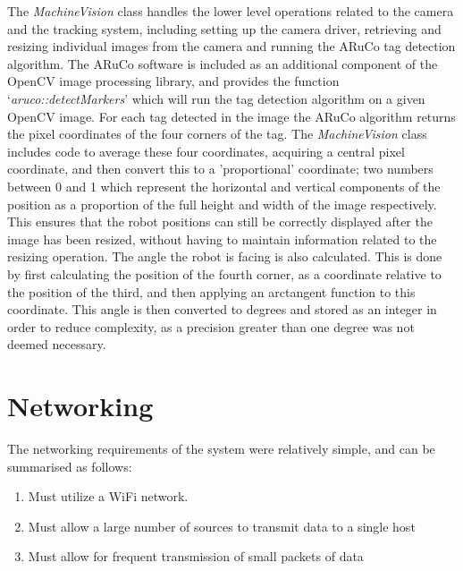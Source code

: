 The \textit{MachineVision} class handles the lower level operations related to the camera and the tracking system, including setting up the camera driver, retrieving and resizing individual images from the camera and running the ARuCo tag detection algorithm. The ARuCo software is included as an additional component of the OpenCV image processing library, and provides the function `\textit{aruco::detectMarkers}' which will run the tag detection algorithm on a given OpenCV image. For each tag detected in the image the ARuCo algorithm returns the pixel coordinates of the four corners of the tag. The \textit{MachineVision} class includes code to average these four coordinates, acquiring a central pixel coordinate, and then convert this to a 'proportional' coordinate; two numbers between 0 and 1 which represent the horizontal and vertical components of the position as a proportion of the full height and width of the image respectively. This ensures that the robot positions can still be correctly displayed after the image has been resized, without having to maintain information related to the resizing operation. The angle the robot is facing is also calculated. This is done by first calculating the position of the fourth corner, as a coordinate relative to the position of the third, and then applying an arctangent function to this coordinate. This angle is then converted to degrees and stored as an integer in order to reduce complexity, as a precision greater than one degree was not deemed necessary.


\section{Networking}
The networking requirements of the system were relatively simple, and can be summarised as follows:

\begin{enumerate}
	\item Must utilize a WiFi network.
	\item Must allow a large number of sources to transmit data to a single host
	\item Must allow for frequent transmission of small packets of data
\end{enumerate}

